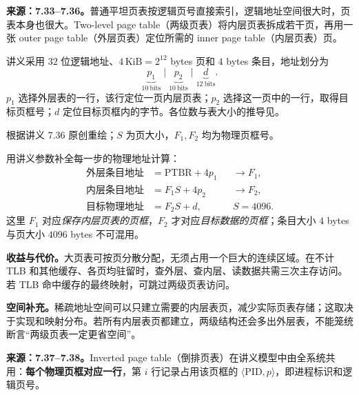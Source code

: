 \textbf{来源：7.33--7.36。}普通平坦页表按逻辑页号直接索引，逻辑地址空间很大时，页表本身也很大。Two-level page table（两级页表）将内层页表拆成若干页，再用一张 outer page table（外层页表）定位所需的 inner page table（内层页表）页。

讲义采用 $32$ 位逻辑地址、$4\,\mathrm{KiB}=2^{12}$ bytes 页和 $4$ bytes 条目，地址划分为
\[
 \boxed{\underbrace{p_1}_{10\ \mathrm{bits}}\;\big|\;
        \underbrace{p_2}_{10\ \mathrm{bits}}\;\big|\;
        \underbrace{d}_{12\ \mathrm{bits}}}.
\]
$p_1$ 选择外层表的一行，该行定位一页内层页表；$p_2$ 选择这一页中的一行，取得目标页框号；$d$ 定位目标页框内的字节。各位数与表大小的推导见。

\begin{center}


{\small 根据讲义 7.36 原创重绘；$S$ 为页大小，$F_1,F_2$ 均为物理页框号。}
\end{center}

用讲义参数补全每一步的物理地址计算：
\[
\begin{aligned}
 \text{外层条目地址}&=\mathrm{PTBR}+4p_1
                   &&\longrightarrow F_1,\\
 \text{内层条目地址}&=F_1S+4p_2
                   &&\longrightarrow F_2,\\
 \text{目标物理地址}&=F_2S+d,
                   &&S=4096.
\end{aligned}
\]
这里 $F_1$ 对应\emph{保存内层页表的页框}，$F_2$ 才对应\emph{目标数据的页框}；条目大小 $4$ bytes 与页大小 $4096$ bytes 不可混用。

\textbf{收益与代价。}大页表可按页分散分配，无须占用一个巨大的连续区域。在不计 TLB 和其他缓存、各页均驻留时，查外层、查内层、读数据共需三次主存访问。若 TLB 命中缓存的最终映射，可跳过两级页表访问。

\textbf{空间补充。}稀疏地址空间可以只建立需要的内层表页，减少实际页表存储；这取决于实现和映射分布。若所有内层表页都建立，两级结构还会多出外层表，不能笼统断言“两级页表一定更省空间”。


\textbf{来源：7.37--7.38。}Inverted page table（倒排页表）在讲义模型中由全系统共用：\textbf{每个物理页框对应一行}，第 $i$ 行记录占用该页框的 $\langle\mathrm{PID},p\rangle$，即进程标识和逻辑页号。

